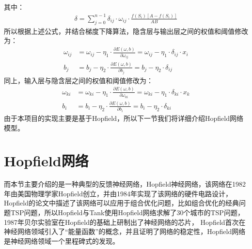 其中：
\begin{align}
    \delta = \sum_{j=0}^{n-1} \delta_{ij} \cdot \omega_{ij} \cdot \frac{f(S_i)[A-f(S_i)]}{AB}
\end{align}
所以根据上述公式，并结合梯度下降算法，隐含层与输出层之间的权值和阈值修改为：
\begin{align}
    \omega_{ij} &=\omega_{ij} - \eta_1 \cdot \frac{\partial E(\omega, b)}{\partial \omega_{ij}} = \omega_{ij} - \eta_1 \cdot \delta_{ij} \cdot x_i \\
    b_j &= b_j - \eta_2 \cdot \frac{\partial E(\omega, b)}{\partial b_j} = b_j - \eta_2 \cdot \delta_{ij}
\end{align}
同上，输入层与隐含层之间的权值和阈值修改为：
\begin{align}
    \omega_{ki} &= \omega_{ki} - \eta_1 \cdot \frac{\partial E(\omega ,b)}{\partial \omega_{ki}} = \omega_{ki} - \eta_1 \cdot \delta_{ki} \cdot x_k \\
    b_i &= b_i - \eta_2 \cdot \frac{\partial E(\omega, b)}{\partial b_i} = b_i - \eta_2 \cdot \delta_{ki}
\end{align}
由于本项目的实现主要是基于Hopfield，所以下一节我们将详细介绍Hopfield网络模型。
\section{Hopfield网络}
而本节主要介绍的是一种典型的反馈神经网络，Hopfield神经网络，该网络在1982年由美国物理学家Hopfield创立，并由1984年实现了该网络的硬件电路设计，
Hopfield的论文中描述了该网络可以应用于组合优化问题，比如组合优化的经典问题TSP问题，所以Hopfield与Tank使用Hopfield网络求解了30个城市的TSP问题，1987年贝尔实验室在Hopfield的基础上研制出了神经网络的芯片，
Hopfield首次在神经网络领域引入了“能量函数”的概念，并且证明了网络的稳定性，Hopfield网络是神经网络领域一个里程碑式的发现。

